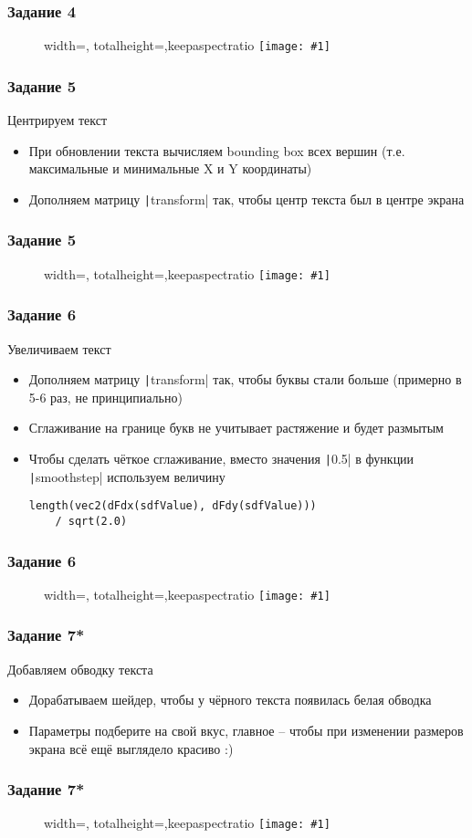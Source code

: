\documentclass{beamer}
\newcommand{\slideimage}[1]{
  \begin{figure}
    \begin{adjustbox}{width=\textwidth, totalheight=\textheight-2\baselineskip-2\baselineskip,keepaspectratio}
      \texttt{[image: \#1]}
    \end{adjustbox}
  \end{figure}
}
\begin{document}
\begin{frame}
\frametitle{Задание 4}
\slideimage{4.png}
\end{frame}

\begin{frame}[fragile]
\frametitle{Задание 5}
Центрируем текст
\begin{itemize}
\item При обновлении текста вычисляем bounding box всех вершин (т.е. максимальные и минимальные X и Y координаты)
\item Дополняем матрицу \texttt|transform| так, чтобы центр текста был в центре экрана
\end{itemize}
\end{frame}

\begin{frame}
\frametitle{Задание 5}
\slideimage{5.png}
\end{frame}

\begin{frame}[fragile]
\frametitle{Задание 6}
Увеличиваем текст
\begin{itemize}
\item Дополняем матрицу \texttt|transform| так, чтобы буквы стали больше (примерно в 5-6 раз, не принципиально)
\item Сглаживание на границе букв не учитывает растяжение и будет размытым
\item Чтобы сделать чёткое сглаживание, вместо значения \texttt|0.5| в функции \texttt|smoothstep| используем величину
\begin{verbatim}
length(vec2(dFdx(sdfValue), dFdy(sdfValue)))
    / sqrt(2.0)
\end{verbatim}

\end{itemize}
\end{frame}

\begin{frame}
\frametitle{Задание 6}
\slideimage{6.png}
\end{frame}

\begin{frame}[fragile]
\frametitle{Задание 7*}
Добавляем обводку текста
\begin{itemize}
\item Дорабатываем шейдер, чтобы у чёрного текста появилась белая обводка
\item Параметры подберите на свой вкус, главное -- чтобы при изменении размеров экрана всё ещё выглядело красиво :)
\end{itemize}
\end{frame}

\begin{frame}
\frametitle{Задание 7*}
\slideimage{7.png}
\end{frame}
\end{document}
